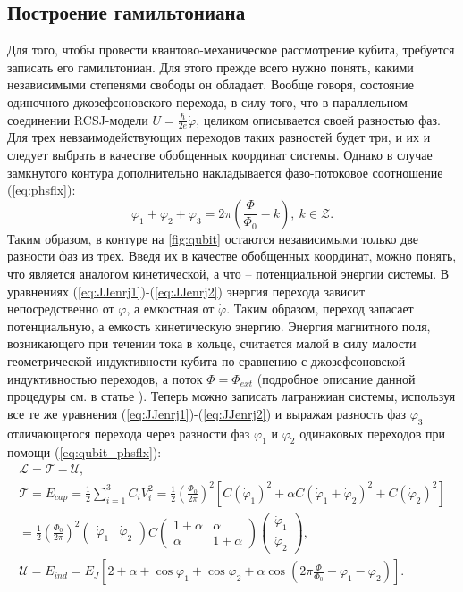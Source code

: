 \documentclass[12pt]{article}
\numberwithin{equation}{section}
\begin{document}
\subsection{Построение гамильтониана}
Для того, чтобы провести квантово-механическое рассмотрение кубита, требуется записать его гамильтониан. Для этого прежде всего нужно понять, какими независимыми степенями свободы он обладает. Вообще говоря, состояние одиночного джозефсоновского перехода, в силу того, что в параллельном соединении RCSJ-модели $U = \frac{\hbar}{2e}\dot\varphi$, целиком описывается своей разностью фаз. Для трех невзаимодействующих переходов таких разностей будет три, и их и следует выбрать в качестве обобщенных координат системы. Однако в случае замкнутого контура дополнительно накладывается фазо-потоковое соотношение (\ref{eq:phsflx}):
\begin{equation}
\varphi_1 + \varphi_2 + \varphi_3 = 2\pi\left(\frac{\Phi}{\Phi_0} - k\right),\ k\in \mathcal{Z}.
\label{eq:qubit_phsflx}
\end{equation}
Таким образом, в контуре на \autoref{fig:qubit} остаются независимыми только две разности фаз из трех. Введя их в качестве обобщенных координат, можно понять, что является аналогом кинетической, а что -- потенциальной энергии системы. В уравнениях (\ref{eq:JJenrj1})-(\ref{eq:JJenrj2}) энергия перехода зависит непосредственно от $\varphi$, а емкостная от $\dot \varphi$. Таким образом, переход запасает потенциальную, а емкость кинетическую энергию. Энергия магнитного поля, возникающего при течении тока в кольце, считается малой в силу малости геометрической индуктивности кубита по сравнению с джозефсоновской индуктивностью переходов, а поток $\Phi = \Phi_{ext}$ (подробное описание данной процедуры см. в статье \cite{Robertson2006}). Теперь можно записать лагранжиан системы, используя все те же уравнения (\ref{eq:JJenrj1})-(\ref{eq:JJenrj2}) и выражая разность фаз $\varphi_3$ отличающегося перехода через разности фаз $\varphi_1$ и $\varphi_2$ одинаковых переходов при помощи (\ref{eq:qubit_phsflx}):
\begin{gather*}
\mathcal{L} = \mathcal{T}-\mathcal{U}, \\
\mathcal{T} = E_{cap} =\frac{1}{2}\sum_{i=1}^3 C_i V_i^2 = \frac{1}{2} \left(\frac{\Phi_0}{2\pi}\right)^2 \left[C(\dot \varphi_1)^2 + \alpha C \left(\dot \varphi_1 + \dot\varphi_2\right)^2 + C(\dot \varphi_2)^2\right] \\
= \frac{1}{2}\left(\frac{\Phi_0}{2\pi}\right)^2 \left(\begin{matrix}
\dot\varphi_1 &\dot\varphi_2
\end{matrix}\right) C \left(\begin{matrix}
1+\alpha & \alpha \\
\alpha & 1+\alpha
\end{matrix}
\right)
\left(\begin{matrix}
\dot\varphi_1 \\
\dot\varphi_2
\end{matrix}\right),\\
\mathcal{U} = E_{ind} = E_J\left[2+\alpha + \cos\varphi_1 + \cos\varphi_2 + \alpha \cos\left(2\pi\frac{\Phi}{\Phi_0} - \varphi_1 - \varphi_2 \right)\right].
\end{gather*}
\end{document}
